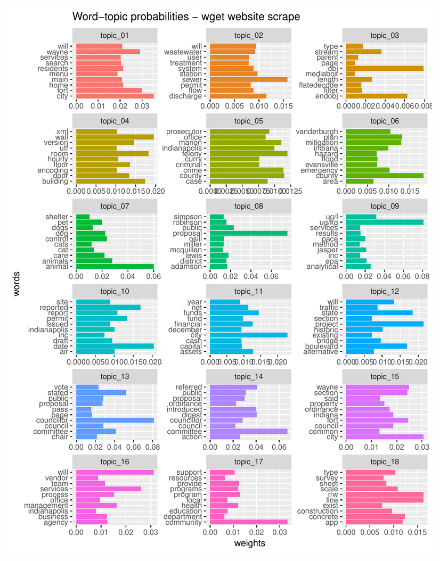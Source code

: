 \documentclass[11pt]{article}
\begin{document}
\begin{figure}[!ht]
	\centering
	\includegraphics[width=\linewidth]{figures/wtp_wget.pdf}
\end{figure}


\end{document}
